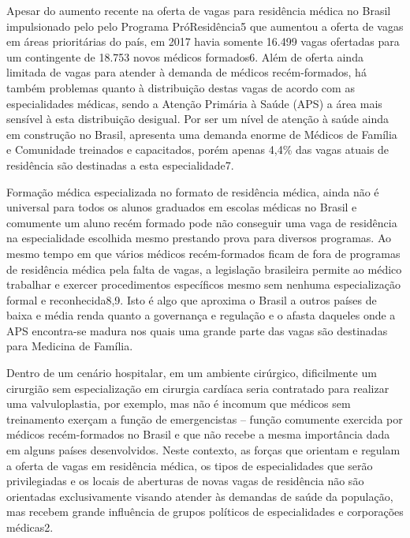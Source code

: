 \documentclass[]{book}
\begin{document}
Apesar do aumento recente na oferta de vagas para residência médica no Brasil impulsionado pelo pelo Programa PróResidência5 que aumentou a oferta de vagas em áreas prioritárias do país, em 2017 havia somente 16.499 vagas ofertadas para um contingente de 18.753 novos médicos formados6. Além de oferta ainda limitada de vagas para atender à demanda de médicos recém-formados, há também problemas quanto à distribuição destas vagas de acordo com as especialidades médicas, sendo a Atenção Primária à Saúde (APS) a área mais sensível à esta distribuição desigual. Por ser um nível de atenção à saúde ainda em construção no Brasil, apresenta uma demanda enorme de Médicos de Família e Comunidade treinados e capacitados, porém apenas 4,4\% das vagas atuais de residência são destinadas a esta especialidade7.

Formação médica especializada no formato de residência médica, ainda não é universal para todos os alunos graduados em escolas médicas no Brasil e comumente um aluno recém formado pode não conseguir uma vaga de residência na especialidade escolhida mesmo prestando prova para diversos programas. Ao mesmo tempo em que vários médicos recém-formados ficam de fora de programas de residência médica pela falta de vagas, a legislação brasileira permite ao médico trabalhar e exercer procedimentos específicos mesmo sem nenhuma especialização formal e reconhecida8,9. Isto é algo que aproxima o Brasil a outros países de baixa e média renda quanto a governança e regulação e o afasta daqueles onde a APS encontra-se madura nos quais uma grande parte das vagas são destinadas para Medicina de Família.

Dentro de um cenário hospitalar, em um ambiente cirúrgico, dificilmente um cirurgião sem especialização em cirurgia cardíaca seria contratado para realizar uma valvuloplastia, por exemplo, mas não é incomum que médicos sem treinamento exerçam a função de emergencistas -- função comumente exercida por médicos recém-formados no Brasil e que não recebe a mesma importância dada em alguns países desenvolvidos. Neste contexto, as forças que orientam e regulam a oferta de vagas em residência médica, os tipos de especialidades que serão privilegiadas e os locais de aberturas de novas vagas de residência não são orientadas exclusivamente visando atender às demandas de saúde da população, mas recebem grande influência de grupos políticos de especialidades e corporações médicas2.
\end{document}
